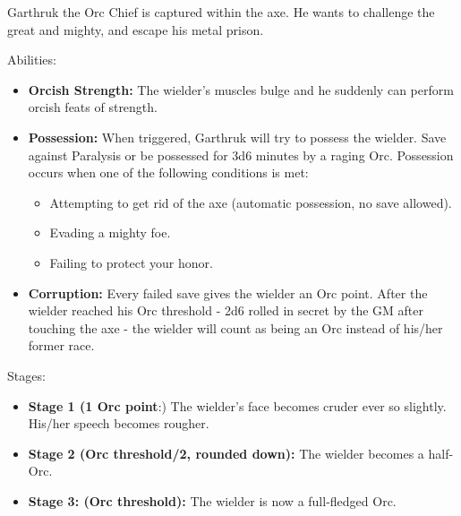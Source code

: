 \documentclass[letterpaper,sansserif,tightsqueeze]{rpg-module}
\begin{document}
Garthruk the Orc Chief is captured within the axe. He wants to challenge the great and mighty, and escape his metal prison.

Abilities:
\begin{itemize}
	\item \textbf{Orcish Strength:} The wielder's muscles bulge and he suddenly can perform orcish feats of strength.
	\item \textbf{Possession:} When triggered, Garthruk will try to possess the wielder. Save against Paralysis or be possessed for 3d6 minutes by a raging Orc. Possession occurs when one of the following conditions is met:
	\begin{itemize}
		\item Attempting to get rid of the axe (automatic possession, no save allowed).
		\item Evading a mighty foe.
		\item Failing to protect your honor.
	\end{itemize}
	\item \textbf{Corruption:} Every failed save gives the wielder an Orc point. After the wielder reached his Orc threshold - 2d6 rolled in secret by the GM after touching the axe - the wielder will count as being an Orc instead of his/her former race.
\end{itemize}
Stages: 
\begin{itemize}
	\item \textbf{Stage 1 (1 Orc point}:) The wielder's face becomes cruder ever so slightly. His/her speech becomes rougher. 
	\item \textbf{Stage 2 (Orc threshold/2, rounded down):} The wielder becomes a half-Orc.
	\item \textbf{Stage 3: (Orc threshold):} The wielder is now a full-fledged Orc.
\end{itemize}
\end{document}
